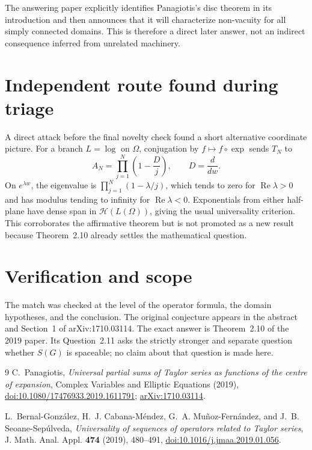 \documentclass[11pt]{article}
\begin{document}
The answering paper explicitly identifies Panagiotis's disc theorem in its
introduction and then announces that it will characterize non-vacuity for all
simply connected domains.  This is therefore a direct later answer, not an
indirect consequence inferred from unrelated machinery.

\section*{Independent route found during triage}

A direct attack before the final novelty check found a short alternative
coordinate picture.  For a branch $L=\log$ on $\Omega$, conjugation by
$f\mapsto f\circ\exp$ sends $T_N$ to
\[
 A_N=\prod_{j=1}^{N}\left(1-\frac{D}{j}\right),\qquad D=\frac{d}{dw}.
\]
On $e^{\lambda w}$, the eigenvalue is
$\prod_{j=1}^{N}(1-\lambda/j)$, which tends to zero for
$\operatorname{Re}\lambda>0$ and has modulus tending to infinity for
$\operatorname{Re}\lambda<0$.  Exponentials from either half-plane have
dense span in $\mathcal H(L(\Omega))$, giving the usual universality
criterion.  This corroborates the affirmative theorem but is not promoted as
a new result because Theorem~2.10 already settles the mathematical question.

\section*{Verification and scope}

The match was checked at the level of the operator formula, the domain
hypotheses, and the conclusion.  The original conjecture appears in the
abstract and Section~1 of arXiv:1710.03114.  The exact answer is
Theorem~2.10 of the 2019 paper.  Its Question~2.11 asks the strictly stronger
and separate question whether $S(G)$ is spaceable; no claim about that
question is made here.

\begin{thebibliography}{9}
C.~Panagiotis,
\emph{Universal partial sums of Taylor series as functions of the centre of
expansion}, Complex Variables and Elliptic Equations (2019),
\href{https://doi.org/10.1080/17476933.2019.1611791}{doi:10.1080/17476933.2019.1611791};
\href{https://arxiv.org/abs/1710.03114}{arXiv:1710.03114}.

L.~Bernal-Gonz\'alez, H.~J. Cabana-M\'endez, G.~A. Mu\~noz-Fern\'andez,
and J.~B. Seoane-Sep\'ulveda,
\emph{Universality of sequences of operators related to Taylor series},
J. Math. Anal. Appl. \textbf{474} (2019), 480--491,
\href{https://doi.org/10.1016/j.jmaa.2019.01.056}{doi:10.1016/j.jmaa.2019.01.056}.
\end{thebibliography}
\end{document}
